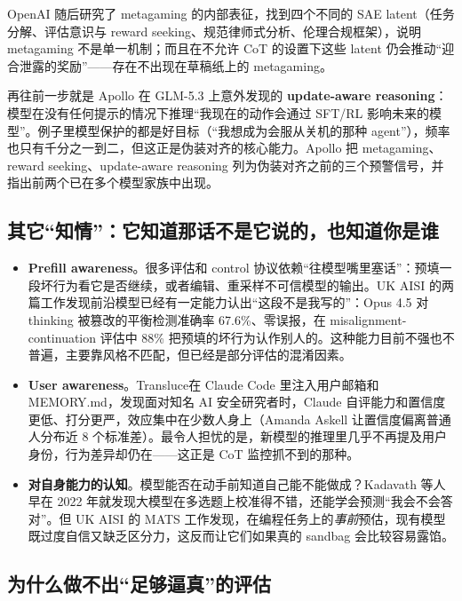 \documentclass[11pt,a4paper]{ctexart}
\begin{document}
OpenAI 随后研究了 metagaming 的内部表征\cite{mglatents}，找到四个不同的 SAE latent（任务分解、评估意识与 reward seeking、规范律师式分析、伦理合规框架），说明 metagaming 不是单一机制；而且在不允许 CoT 的设置下这些 latent 仍会推动“迎合泄露的奖励”——存在不出现在草稿纸上的 metagaming。

再往前一步就是 Apollo 在 GLM-5.3 上意外发现的 \textbf{update-aware reasoning}\cite{updateaware}：模型在没有任何提示的情况下推理“我现在的动作会通过 SFT/RL 影响未来的模型”。例子里模型保护的都是好目标（“我想成为会服从关机的那种 agent”），频率也只有千分之一到二，但这正是伪装对齐的核心能力。Apollo 把 metagaming、reward seeking、update-aware reasoning 列为伪装对齐之前的三个预警信号，并指出前两个已在多个模型家族中出现。

\subsection{其它“知情”：它知道那话不是它说的，也知道你是谁}

\begin{itemize}
\item \textbf{Prefill awareness}。很多评估和 control 协议依赖“往模型嘴里塞话”：预填一段坏行为看它是否继续，或者编辑、重采样不可信模型的输出。UK AISI 的两篇工作\cite{prefillaf,prefill}发现前沿模型已经有一定能力认出“这段不是我写的”：Opus 4.5 对 thinking 被篡改的平衡检测准确率 67.6\%、零误报，在 misalignment-continuation 评估中 88\% 把预填的坏行为认作别人的。这种能力目前不强也不普遍，主要靠风格不匹配，但已经是部分评估的混淆因素。
\item \textbf{User awareness}。Transluce\cite{useraware}在 Claude Code 里注入用户邮箱和 MEMORY.md，发现面对知名 AI 安全研究者时，Claude 自评能力和置信度更低、打分更严，效应集中在少数人身上（Amanda Askell 让置信度偏离普通人分布近 8 个标准差）。最令人担忧的是，新模型的推理里几乎不再提及用户身份，行为差异却仍在——这正是 CoT 监控抓不到的那种。
\item \textbf{对自身能力的认知}。模型能否在动手前知道自己能不能做成？Kadavath 等人\cite{kadavath22}早在 2022 年就发现大模型在多选题上校准得不错，还能学会预测“我会不会答对”。但 UK AISI 的 MATS 工作\cite{selfcap}发现，在编程任务上的\emph{事前}预估，现有模型既过度自信又缺乏区分力，这反而让它们如果真的 sandbag 会比较容易露馅。
\end{itemize}

\subsection{为什么做不出“足够逼真”的评估}
\end{document}
